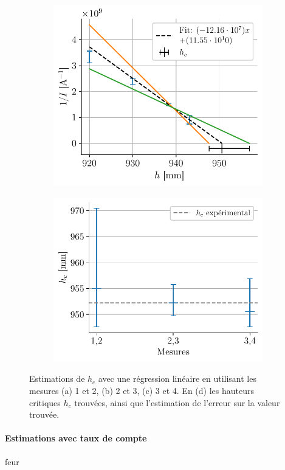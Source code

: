 \begin{figure}[H]
\begin{subfigure}{0.48\linewidth}
        \caption{}
        \label{fig:hc_I_23}
    \end{subfigure}
    \begin{subfigure}{0.48\linewidth}
        \centering
        \includegraphics[width=\linewidth]{figures/h_I_pair34.pdf}
        \caption{}
        \label{fig:hc_I_34}
    \end{subfigure}
    \begin{subfigure}{0.48\linewidth}
        \centering
        \includegraphics[width=\linewidth]{figures/hc_results_I.pdf}
        \caption{}
        \label{fig:hc_I}
    \end{subfigure}
    \caption{Estimations de \(h_c\) avec une régression linéaire en utilisant les mesures (a) 1 et 2, (b) 2 et 3, (c) 3 et 4. En (d) les hauteurs critiques \(h_c\) trouvées, ainsi que l'estimation de l'erreur sur la valeur trouvée.}
    \label{fig:hc_intensite}
\end{figure}

\paragraph*{Estimations avec taux de compte}
feur